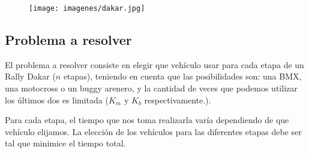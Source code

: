 \newcommand{\graficarDatosMio}[6]{
  \begin{tikzpicture}
  \begin{axis}[
      title={#1},
      xlabel={#2},
      ylabel={#3},
      scaled x ticks=false,
      scaled y ticks=false,
      width=0.6\textwidth
  ]
  \addplot[only marks, color=black] table[x=#4,y=#5]{#6};
  \end{axis}
\end{tikzpicture}
}

\newcommand{\graficarDatosSinOutliers}[8]{
  \begin{tikzpicture}
  \begin{axis}[
      title={#1},
      xlabel={#2},
      ylabel={#3},
      scaled x ticks=false,
      scaled y ticks=false,
      width=0.6\textwidth,
      ymin=#7,
      ymax=#8,
      restrict y to domain=#7:#8
  ]
  \addplot[only marks, color=black] table[x=#4,y=#5]{#6};
  \end{axis}
\end{tikzpicture}
}


\begin{figure}[h]
\begin{center}
\texttt{[image: imagenes/dakar.jpg]}
\end{center}
\end{figure}

\subsection{Problema a resolver}

El problema a resolver consiste en elegir que vehículo usar para cada etapa de un Rally Dakar ($n$ etapas), teniendo en cuenta que las posibilidades son: una BMX, una motocross o un buggy arenero, y la cantidad de veces que podemos utilizar los últimos dos es limitada ($K_m$ y $K_b$ respectivamente.).

Para cada etapa, el tiempo que nos toma realizarla varía dependiendo de que vehículo elijamos. La elección de los vehículos para las diferentes etapas debe ser tal que minimice el tiempo total.

